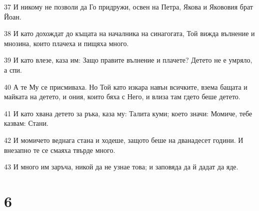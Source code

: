 \par 37 И никому не позволи да Го придружи, освен на Петра, Якова и Якововия брат Йоан.
\par 38 И като дохождат до къщата на началника на синагогата, Той вижда вълнение и мнозина, които плачеха и пищяха много.
\par 39 И като влезе, каза им: Защо правите вълнение и плачете? Детето не е умряло, а спи.
\par 40 А те Му се присмиваха. Но Той като изкара навън всичките, взема бащата и майката на детето, и ония, които бяха с Него, и влиза там гдето беше детето.
\par 41 И като хвана детето за ръка, каза му: Талита куми; което значи: Момиче, тебе казвам: Стани.
\par 42 И момичето веднага стана и ходеше, защото беше на дванадесет години. И внезапно те се смаяха твърде много.
\par 43 И много им заръча, никой да не узнае това; и заповяда да й дадат да яде.

\chapter{6}

